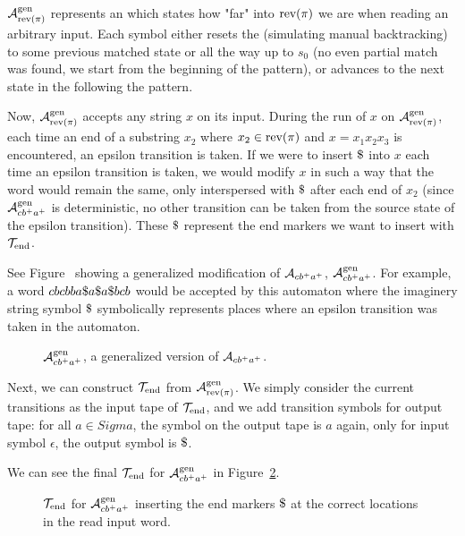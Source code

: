$\mathcal{A}^{\text{gen}}_{\text{rev(}\pi\text{)}}$ represents an \dfa which states how "far" into $\text{rev(}\pi\text{)}$ we are when reading an arbitrary input.
Each symbol either resets the \dfa (simulating manual backtracking) to some previous matched state or all the way up to $s_0$ (no even partial match was found, we start from the beginning of the pattern), or advances to the next state in the \dfa following the pattern.

Now, $\mathcal{A}^{\text{gen}}_{\text{rev(}\pi\text{)}}$ accepts any string $x$ on its input.
During the run of $x$ on $\mathcal{A}^{\text{gen}}_{\text{rev(}\pi\text{)}}$, each time an end of a substring $x_2$ where $x_2 \in \text{rev(}\pi\text{)}$ and $x = x_1 x_2 x_3$ is encountered, an epsilon transition is taken.
If we were to insert $\marker$ into $x$ each time an epsilon transition is taken, we would modify $x$ in such a way that the word would remain the same, only interspersed with $\marker$ after each end of $x_2$ (since $\mathcal{A}^{\text{gen}}_{cb^+a^+}$ is deterministic, no other transition can be taken from the source state of the epsilon transition).
These $\marker$ represent the end markers we want to insert with $\mathcal{T}_{\text{end}}$.

See Figure~\cite{fig:generalized_end_marker_dfa} showing a generalized modification of \dfa $\mathcal{A}_{cb^+a^+}$, $\mathcal{A}^{\text{gen}}_{cb^+a^+}$.
For example, a word $cbcbba\$ a\$ a\$ bcb$ would be accepted by this automaton where the imaginery string symbol $\marker$ symbolically represents places where an epsilon transition was taken in the automaton.

\begin{figure}[ht]
  \centering
  \caption{\dfa $\mathcal{A}^{\text{gen}}_{cb^+a^+}$, a generalized version of $\mathcal{A}_{cb^+a^+}$.}
  \label{fig:generalized_end_marker_dfa}
\end{figure}

Next, we can construct $\mathcal{T}_{\text{end}}$ from $\mathcal{A}^{\text{gen}}_{\text{rev(}\pi\text{)}}$.
We simply consider the current transitions as the input tape of $\mathcal{T}_{\text{end}}$,
and we add transition symbols for output tape: for all $a \in Sigma$, the  symbol on the output tape is $a$ again, only for input symbol $\epsilon$, the output symbol is $\marker$.

We can see the final $\mathcal{T}_{\text{end}}$ for $\mathcal{A}^{\text{gen}}_{cb^+a^+}$ in Figure~\ref{fig:generalized_end_marker_dft}.
\begin{figure}[ht]
  \centering
  \caption{\dft $\mathcal{T}_{\text{end}}$ for $\mathcal{A}^{\text{gen}}_{cb^+a^+}$ inserting the end markers $\marker$ at the correct locations in the read input word.}
  \label{fig:generalized_end_marker_dft}
\end{figure}

